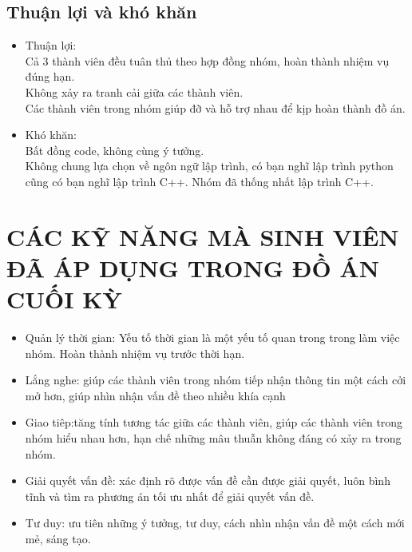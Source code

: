 \documentclass[article]{llncs}
\begin{document}
\subsection{Thuận lợi và khó khăn}
    \begin{itemize}
        \item Thuận lợi:\\
    Cả 3 thành viên đều tuân thủ theo hợp đồng nhóm, hoàn thành nhiệm vụ đúng hạn.\\
    Không xảy ra tranh cải giữa các thành viên.\\
    Các thành viên trong nhóm giúp đỡ và hỗ trợ nhau để kịp hoàn thành đồ án.
    \end{itemize}
    \begin{itemize}
        \item Khó khăn:\\
    Bất đồng code, không cùng ý tưởng.\\
    Không chung lựa chọn về ngôn ngữ lập trình, có bạn nghĩ lập trình python cũng có bạn nghĩ lập trình C++. Nhóm đã thống nhất lập trình C++.
    \end{itemize}

\newpage

\section{CÁC KỸ NĂNG MÀ SINH VIÊN ĐÃ ÁP DỤNG TRONG ĐỒ ÁN CUỐI KỲ}
\begin{itemize}
    \item Quản lý thời gian: Yếu tố thời gian là một yếu tố quan trong trong làm việc nhóm. Hoàn thành nhiệm vụ trước thời hạn.
\end{itemize}
\begin{itemize}
    \item Lắng nghe: giúp các thành viên trong nhóm tiếp nhận thông tin một cách cởi mở hơn, giúp nhìn nhận vấn đề theo nhiều khía cạnh
\end{itemize}
\begin{itemize}
    \item Giao tiêp:tăng tính tương tác giữa các thành viên, giúp các thành viên trong nhóm hiểu nhau hơn, hạn chế những mâu thuẫn không đáng có xảy ra trong nhóm.
\end{itemize}
\begin{itemize}
    \item Giải quyết vấn đề: xác định rõ được vấn đề cần được giải quyết, luôn bình tĩnh và tìm ra phương án tối ưu nhất để giải quyết vấn đề.
\end{itemize}
\begin{itemize}
    \item Tư duy: ưu tiên những ý tưởng, tư duy, cách nhìn nhận vấn đề một cách mới mẻ, sáng tạo.
\end{itemize}
\end{document}
